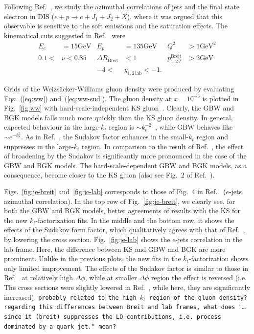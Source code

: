 \documentclass[11pt]{article}
\numberwithin{equation}{section}
\numberwithin{table}{section}
\numberwithin{figure}{section}
\newcommand{\GeV}[0]{\mathrm{GeV}}
\newcommand{\comment}[1]{\texttt{\color{red}#1}}
\begin{document}
Following Ref.~\cite{vanHameren:2021sqc}, we study the azimuthal correlations of jets and the final state electron in DIS ($e+p\rightarrow e+J_1+J_2+X$), where it was argued that this observable is sensitive to the soft emissions and the saturation effects. 
The kinematical cuts suggested in Ref.~\cite{vanHameren:2021sqc} were
\begin{align*}
	E_e&=15\GeV& E_p&=135\GeV& Q^2&>1\GeV^2\\
	0.1<&\nu<0.85&\Delta R_{\mathrm{Breit}}&<1&p^{\mathrm{Breit}}_{1,2\,T}&>3\GeV\\
	&&-4<&y_{1,2\,\mathrm{lab}}<-1.&&
\end{align*}

Grids of the Weizs\"acker-Williams gluon density were produced by evaluating Eqs.~(\ref{eq:ww}) and~(\ref{eq:ww-sud}).
The gluon density at $x=10^{-3}$ is plotted in Fig.~\ref{fig:ww} with hard-scale-independent KS gluon~\cite{vanHameren:2021sqc}. Clearly, the GBW and BGK models falls much more quickly than the KS gluon density. In general, expected behaviour in the large-$k_t$ region is $\sim k_t^{-2}$~\cite{Dominguez:2010xd,Dominguez:2011wm}, while GBW behaves like $\sim e^{-k_t^2}$.
As in Ref.~\cite{vanHameren:2021sqc}, the Sudakov factor enhances in the small-$k_t$ region and suppresses in the large-$k_t$ region. In comparison to the result of Ref.~\cite{vanHameren:2021sqc}, the effect of broadening by the Sudakov is significantly more pronounced in the case of the GBW and BGK models. The hard-scale-dependent GBW and BGK models, as a consequence, become closer to the KS gluon (also see Fig.~2 of Ref.~\cite{vanHameren:2021sqc}).  

Figs.~\ref{fig:je-breit} and~\ref{fig:je-lab} corresponds to those of Fig.~4 in Ref.~\cite{vanHameren:2021sqc} ($e$-jets azimuthal correlation). 
In the top row of Fig.~\ref{fig:je-breit}, we clearly see, for both the GBW and BGK models, better agreements of results with the KS for the new $k_t$-factorization fits. In the middle and the bottom row, it shows the effects of the Sudakov form factor, which qualitatively agrees with that of Ref.~\cite{vanHameren:2021sqc}, by lowering the cross section.
Fig.~\ref{fig:je-lab} shows the $e$-jets correlation in the lab frame. Here, the difference between KS and GBW and BGK are more prominent. Unlike in the previous plots, the new fits in the $k_t$-factorization shows only limited improvement.
The effects of the Sudakov factor is similar to those in Ref.~\cite{vanHameren:2021sqc} at relatively high $\Delta \phi$, while at smaller $\Delta \phi$ region the effect is reversed (i.e. The cross sections were slightly lowered in Ref.~\cite{vanHameren:2021sqc}, while here, they are significantly increased). \comment{probably related to the high $k_t$ region of the gluon density?}\\
\comment{regarding this differences between Breit and lab frames, what does "\dots since it (breit) suppresses the LO contributions, i.e. process dominated by a quark jet." mean?}
\end{document}

